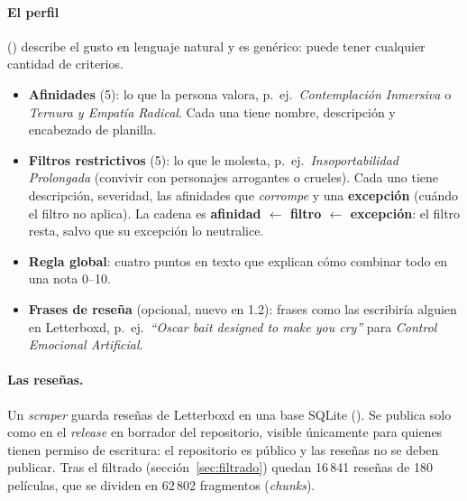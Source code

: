 \documentclass[11pt,a4paper]{article}
\begin{document}
\paragraph{El perfil} () describe el gusto en lenguaje natural y es
genérico: puede tener cualquier cantidad de criterios.
\begin{itemize}
  \item \textbf{Afinidades} (5): lo que la persona valora, p.~ej.\ \emph{Contemplación Inmersiva} o \emph{Ternura y
  Empatía Radical}. Cada una tiene nombre, descripción y encabezado de planilla.
  \item \textbf{Filtros restrictivos} (5): lo que le molesta, p.~ej.\ \emph{Insoportabilidad Prolongada} (convivir con
  personajes arrogantes o crueles). Cada uno tiene descripción, severidad, las afinidades que \emph{corrompe} y una
  \textbf{excepción} (cuándo el filtro no aplica). La cadena es \textbf{afinidad $\leftarrow$ filtro $\leftarrow$
  excepción}: el filtro resta, salvo que su excepción lo neutralice.
  \item \textbf{Regla global}: cuatro puntos en texto que explican cómo combinar todo en una nota 0--10.
  \item \textbf{Frases de reseña} (opcional, nuevo en 1.2): frases como las escribiría alguien en Letterboxd, p.~ej.\
  \emph{``Oscar bait designed to make you cry''} para \emph{Control Emocional Artificial}.
\end{itemize}

\paragraph{Las reseñas.} Un \emph{scraper} guarda reseñas de Letterboxd en una base SQLite (). Se publica solo como  en el \emph{release} en borrador 
del repositorio, visible únicamente para quienes tienen permiso de escritura: el repositorio es público y las reseñas
no se deben publicar. Tras el filtrado (sección~\ref{sec:filtrado}) quedan 16\,841 reseñas de 180 películas, que se
dividen en 62\,802 fragmentos (\emph{chunks}).
\end{document}
